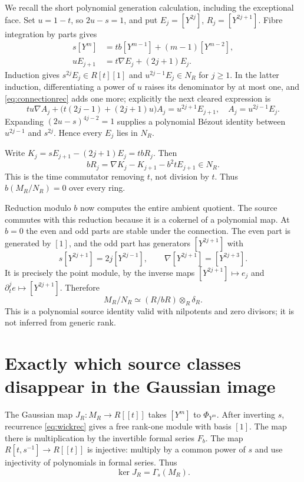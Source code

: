 \documentclass[11pt]{article}
\theoremstyle{definition}\newtheorem{definition}[theorem]{Definition}
\theoremstyle{remark}\newtheorem{remark}[theorem]{Remark}
\begin{document}
We recall the short polynomial generation calculation, including
the exceptional face. Set $u=1-t$, so $2u-s=1$, and put
$E_j=[Y^{2j}]$, $R_j=[Y^{2j+1}]$. Fibre integration by parts gives
\begin{align}
 s[Y^m]&=tb[Y^{m-1}]+(m-1)[Y^{m-2}],\label{eq:wickrec}\\
 uE_{j+1}&=t\nabla E_j+(2j+1)E_j.\label{eq:connectionrec}
\end{align}
Induction gives $s^{2j}E_j\in R[t][1]$ and
$u^{2j-1}E_j\in N_R$ for $j\ge1$. In the latter induction,
differentiating a power of $u$ raises its denominator by at most
one, and \eqref{eq:connectionrec} adds one more; explicitly the
next cleared expression is
\[
 tu\nabla A_j+\bigl(t(2j-1)+(2j+1)u\bigr)A_j
       =u^{2j+1}E_{j+1},\quad A_j=u^{2j-1}E_j.
\]
Expanding $(2u-s)^{4j-2}=1$ supplies a polynomial B\'ezout identity
between $u^{2j-1}$ and $s^{2j}$. Hence every $E_j$ lies in $N_R$.

Write $K_j=sE_{j+1}-(2j+1)E_j=tbR_j$. Then
\begin{equation}\label{eq:content}
 bR_j=\nabla K_j-K_{j+1}-b^2tE_{j+1}\in N_R.
\end{equation}
This is the time commutator removing $t$, not division by $t$.
Thus $b(M_R/N_R)=0$ over every ring.

Reduction modulo $b$ now computes the entire ambient quotient.
The source commutes with this reduction because it is a cokernel
of a polynomial map. At $b=0$ the even and odd parts are stable
under the connection. The even part is generated by $[1]$, and
the odd part has generators $[Y^{2j+1}]$ with
\[
 s[Y^{2j+1}]=2j[Y^{2j-1}],\qquad
 \nabla[Y^{2j+1}]=[Y^{2j+3}].
\]
It is precisely the point module, by the inverse maps
$[Y^{2j+1}]\mapsto e_j$ and $\partial_t^j e\mapsto[Y^{2j+1}]$.
Therefore
\begin{equation}\label{eq:ambientdefect}
 M_R/N_R\simeq(R/bR)\otimes_R\delta_R.
\end{equation}
This is a polynomial source identity valid with nilpotents and
zero divisors; it is not inferred from generic rank.

\section{Exactly which source classes disappear in the Gaussian image}

The Gaussian map $J_R:M_R\to R[[t]]$ takes $[Y^m]$ to
$\Phi_{Y^m}$. After inverting $s$, recurrence
\eqref{eq:wickrec} gives a free rank-one module with basis $[1]$.
The map there is multiplication by the invertible formal series
$F_b$. The map $R[t,s^{-1}]\to R[[t]]$ is injective: multiply by
a common power of $s$ and use injectivity of polynomials in formal
series. Thus
\begin{equation}\label{eq:kernel}
 \ker J_R=\Gamma_s(M_R).
\end{equation}
\end{document}
